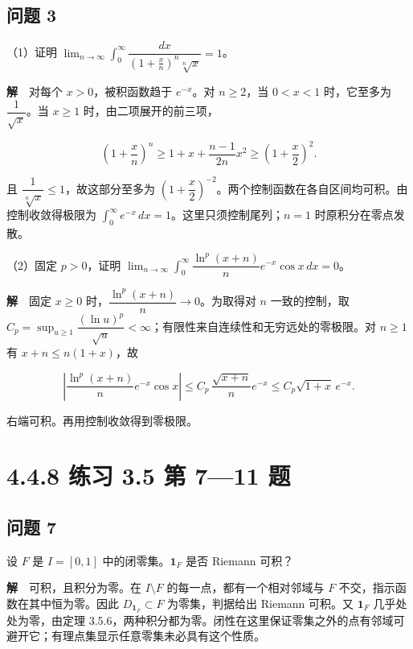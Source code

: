 \documentclass[11pt,a4paper]{article}
\begin{document}
\subsection{问题 3}\label{ux95eeux9898-3}

（1）证明
\(\lim_{n\to\infty}\int_0^\infty\dfrac{dx}{\left(1+\frac xn\right)^n\sqrt[n]{x}}=1\)。

\textbf{解}　对每个 \(x>0\)，被积函数趋于 \(e^{-x}\)。对 \(n\ge2\)，当
\(0<x<1\) 时，它至多为 \(\dfrac1{\sqrt{x}}\)。当 \(x\ge1\)
时，由二项展开的前三项，

\begin{equation*}
\left(1+\frac xn\right)^n
\ge 1+x+\frac{n-1}{2n}x^2
\ge \left(1+\frac x2\right)^2 .
\end{equation*}

且 \(\dfrac1{\sqrt[n]{x}}\le1\)，故这部分至多为
\((1+\dfrac x2)^{-2}\)。两个控制函数在各自区间均可积。由控制收敛得极限为
\(\int_0^\infty e^{-x}\,dx=1\)。这里只须控制尾列；\(n=1\)
时原积分在零点发散。

（2）固定 \(p>0\)，证明
\(\lim_{n\to\infty}\int_0^\infty\dfrac{\ln^p(x+n)}{n}e^{-x}\cos x\,dx=0\)。

\textbf{解}　固定 \(x\ge0\) 时，\(\dfrac{\ln^p(x+n)}n\to0\)。为取得对
\(n\) 一致的控制，取
\(C_p=\sup_{u\ge1}\dfrac{(\ln u)^p}{\sqrt u}<\infty\)；有限性来自连续性和无穷远处的零极限。对
\(n\ge1\) 有 \(x+n\le n(1+x)\)，故

\begin{equation*}
\left|\frac{\ln^p(x+n)}n e^{-x}\cos x\right|
\le C_p\,\frac{\sqrt{x+n}}n e^{-x}
\le C_p\sqrt{1+x}\,e^{-x}.
\end{equation*}

右端可积。再用控制收敛得到零极限。

\section[\S{}4.4.8 练习 3.5 第 7---11
题]{4.4.8 练习 3.5 第 7---11
题}\label{ux7ec3ux4e60-3.5-ux7b2c-711-ux9898}

\subsection{问题 7}\label{ux95eeux9898-7}

设 \(F\) 是 \(I=[0,1]\) 中的闭零集。\(\mathbf1_F\) 是否 Riemann 可积？

\textbf{解}　可积，且积分为零。在 \(I\setminus F\)
的每一点，都有一个相对邻域与 \(F\) 不交，指示函数在其中恒为零。因此
\(D_{\mathbf1_F}\subset F\) 为零集，判据给出 Riemann 可积。又
\(\mathbf1_F\) 几乎处处为零，由定理
3.5.6，两种积分都为零。闭性在这里保证零集之外的点有邻域可避开它；有理点集显示任意零集未必具有这个性质。
\end{document}

